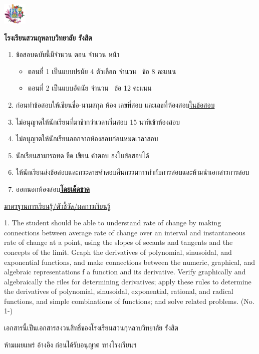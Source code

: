 \documentclass[noquestionbreak]{../../skrexam}  %
\newcommand*\SchoolNameTH{\textbf{\Large โรงเรียนสวนกุหลาบวิทยาลัย รังสิต}}
\newcommand*\LearningOutCome{%
1.  The student should be able to understand rate of change by making connections between average rate of change over an interval and instantaneous rate of change at a point, using the slopes of secants and tangents and the concepts of the limit. Graph the derivatives of polynomial, sinusoidal, and exponential functions, and make connections between the numeric, graphical, and algebraic representations f a function and its derivative. Verify graphically and algebraically the riles for determining derivatives; apply these rules to determine the derivatives of polynomial, sinusoidal, exponential, rational, and radical functions, and simple combinations of functions; and solve related problems. (No. 1-\ntotalquestion)
}
\begin{document}
\begin{coverpages}
	\coverpagefont
	\begin{center}
	
	\includegraphics{SKRsmall.png}
	
	\coverpagefont
	
	\SchoolNameTH
	
	\end{center}
	
	\ThaiDescription
		
	\begin{enumerate}
		\item ข้อสอบฉบับนี้มีจำนวน  ตอน  จำนวน  หน้า
		\begin{itemize}
			\item[] ตอนที่ 1 เป็นแบบปรนัย 4 ตัวเลือก จำนวน \nmultiplechoice\ ข้อ 8 คะแนน
			\item[] ตอนที่ 2 เป็นแบบอัตนัย จำนวน \nshortanswer\ ข้อ 12 คะแนน		
		\end{itemize}
		\item ก่อนทำข้อสอบให้เขียนชื่อ-นามสกุล ห้อง เลขที่สอบ และเลขที่ห้องสอบ\underline{ในข้อสอบ}
		\item ไม่อนุญาตให้นักเรียนที่มาช้ากว่าเวลาเริ่มสอบ 15 นาทีเข้าห้องสอบ
		\item ไม่อนุญาตให้นักเรียนออกจากห้องสอบก่อนหมดเวลาสอบ
		\item นักเรียนสามารถทด ขีด เขียน คำตอบ ลงในข้อสอบได้
		\item ให้นักเรียนส่งข้อสอบและกระดาษคำตอบคืนกรรมการกำกับการสอบและห้ามนำเอกสารการสอบ
		\item ออกนอกห้องสอบ\underline{\textbf{โดยเด็ดขาด}}
	\end{enumerate}
	
	
	\asteriskfill
	
	
	\begin{center}
	\underline{มาตรฐานการเรียนรู้/ตัวชี้วัด/ผลการเรียนรู้}
	\end{center}
	
	\LearningOutCome
	

	\asteriskfill
	
	
	\begin{tcolorbox}[halign upper = center]
	
	เอกสารนี้เป็นเอกสารสงวนสิทธิ์ของโรงเรียนสวนกุหลาบวิทยาลัย รังสิต
	
	ห้ามเผยแพร่  อ้างอิง ก่อนได้รับอนุญาต  ทางโรงเรียนฯ 
	\end{tcolorbox}

\end{coverpages}
\end{document}
